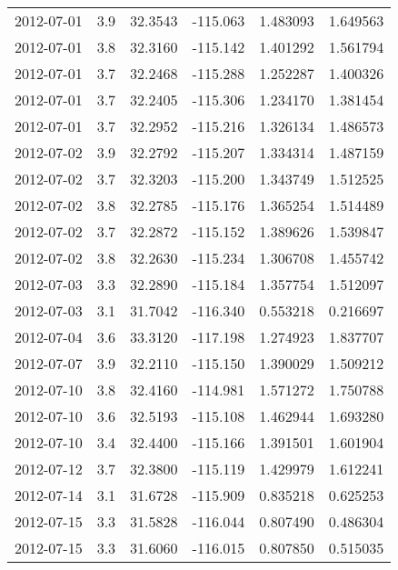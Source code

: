 \begin{tabular}{lrrrrr}
2012-07-01 &       3.9 &  32.3543 &  -115.063 &         1.483093 &         1.649563 \\
2012-07-01 &       3.8 &  32.3160 &  -115.142 &         1.401292 &         1.561794 \\
2012-07-01 &       3.7 &  32.2468 &  -115.288 &         1.252287 &         1.400326 \\
2012-07-01 &       3.7 &  32.2405 &  -115.306 &         1.234170 &         1.381454 \\
2012-07-01 &       3.7 &  32.2952 &  -115.216 &         1.326134 &         1.486573 \\
2012-07-02 &       3.9 &  32.2792 &  -115.207 &         1.334314 &         1.487159 \\
2012-07-02 &       3.7 &  32.3203 &  -115.200 &         1.343749 &         1.512525 \\
2012-07-02 &       3.8 &  32.2785 &  -115.176 &         1.365254 &         1.514489 \\
2012-07-02 &       3.7 &  32.2872 &  -115.152 &         1.389626 &         1.539847 \\
2012-07-02 &       3.8 &  32.2630 &  -115.234 &         1.306708 &         1.455742 \\
2012-07-03 &       3.3 &  32.2890 &  -115.184 &         1.357754 &         1.512097 \\
2012-07-03 &       3.1 &  31.7042 &  -116.340 &         0.553218 &         0.216697 \\
2012-07-04 &       3.6 &  33.3120 &  -117.198 &         1.274923 &         1.837707 \\
2012-07-07 &       3.9 &  32.2110 &  -115.150 &         1.390029 &         1.509212 \\
2012-07-10 &       3.8 &  32.4160 &  -114.981 &         1.571272 &         1.750788 \\
2012-07-10 &       3.6 &  32.5193 &  -115.108 &         1.462944 &         1.693280 \\
2012-07-10 &       3.4 &  32.4400 &  -115.166 &         1.391501 &         1.601904 \\
2012-07-12 &       3.7 &  32.3800 &  -115.119 &         1.429979 &         1.612241 \\
2012-07-14 &       3.1 &  31.6728 &  -115.909 &         0.835218 &         0.625253 \\
2012-07-15 &       3.3 &  31.5828 &  -116.044 &         0.807490 &         0.486304 \\
2012-07-15 &       3.3 &  31.6060 &  -116.015 &         0.807850 &         0.515035 \\

\end{tabular}
